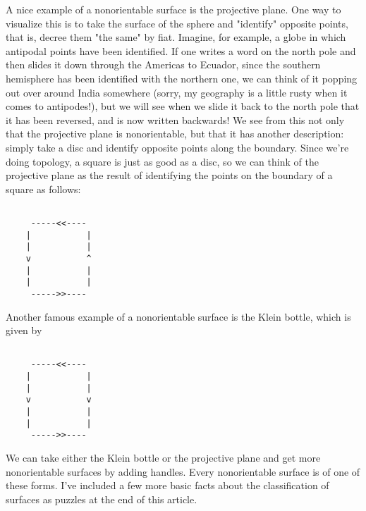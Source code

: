 A nice example of a nonorientable surface is the projective plane.  One
way to visualize this is to take the surface of the sphere and
"identify" opposite points, that is, decree them "the same" by fiat.
Imagine, for example, a globe in which antipodal points have been
identified.  If one writes a word on the north pole and then slides it
down through the Americas to Ecuador, since the southern hemisphere has
been identified with the northern one, we can think of it popping out
over around India somewhere (sorry, my geography is a little rusty when
it comes to antipodes!), but we will see when we slide it back to the
north pole that it has been reversed, and is now written backwards!  We
see from this not only that the projective plane is nonorientable, but
that it has another description: simply take a disc and identify
opposite points along the boundary.  Since we're doing topology, a
square is just as good as a disc, so we can think of the projective
plane as the result of identifying the points on the boundary of a
square as follows:



\begin{verbatim}

     -----<<----
    |           |
    |           |  
    v           ^
    |           |
    |           |
     ----->>----

\end{verbatim}
    

Another famous example of a nonorientable surface is the Klein bottle,
which is given by



\begin{verbatim}

     -----<<----
    |           |
    |           |
    v           v
    |           |
    |           |
     ----->>----

\end{verbatim}
    

We can take either the Klein bottle or the projective plane and get more
nonorientable surfaces by adding handles.  Every nonorientable surface
is of one of these forms.  I've included a few more basic facts about
the classification of surfaces as puzzles at the end of this article.

